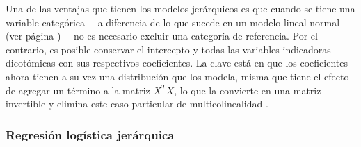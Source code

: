 \begin{table}
\centering
{}
\caption{Ejemplos esquemáticos de regresiones jerárquicas lineales. Fuente: elaboración propia.}
\label{tbl:Regr_Jer_Lineales}
\end{table}

Una de las ventajas que tienen los modelos jerárquicos es que cuando se tiene una variable categórica--- a diferencia de lo que sucede en un modelo lineal normal (ver página \pageref{prob_multicolinealidad})--- no es necesario excluir una categoría de referencia. Por el contrario, es posible conservar el intercepto y todas las variables indicadoras dicotómicas con sus respectivos coeficientes. La clave está en que los coeficientes ahora tienen a su vez una distribución que los modela, misma que tiene el efecto de agregar un término a la matriz $X^TX$, lo que la convierte en una matriz invertible y elimina este caso particular de multicolinealidad \parencite{GelmanHill06}. 

\subsubsection*{Regresión logística jerárquica}

